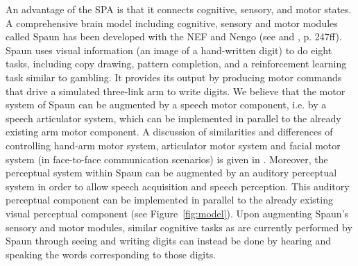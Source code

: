 \documentclass[conference]{IEEEtran}
\begin{document}
An advantage of the SPA is that it connects cognitive,
sensory, and motor states. A comprehensive brain model including
cognitive, sensory and motor modules called Spaun has been
developed with the NEF and Nengo (see \cite{eliasmith2012} and \cite{eliasmith2013}, p. 247ff).
Spaun uses visual information (an image of a hand-written digit)
to do eight tasks, including copy drawing,
pattern completion, and a reinforcement learning task
similar to gambling.
It provides its output by producing motor commands that
drive a simulated three-link arm to write digits.
We believe that the motor system of Spaun
can be augmented by a speech motor component, i.e. by a speech
articulator system, which can be implemented in parallel to the
already existing arm motor component. A discussion of similarities
and differences of controlling hand-arm motor system, articulator
motor system and facial motor system (in face-to-face communication
scenarios) is given in \cite{kroger2010}. Moreover, the perceptual
system within Spaun can be augmented by an auditory perceptual system
in order to allow speech acquisition and speech perception. This
auditory perceptual component can be implemented in parallel to the
already existing visual perceptual component (see
Figure~\ref{fig:model}).
Upon augmenting Spaun's sensory and motor modules,
similar cognitive tasks as are currently performed by Spaun
through seeing and writing digits
can instead be done by hearing and speaking
the words corresponding to those digits.
\end{document}
